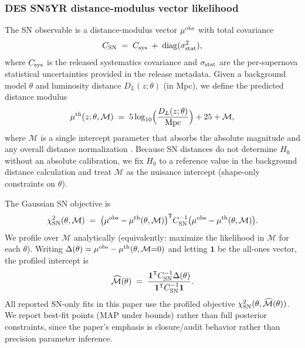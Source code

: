 \documentclass[11pt]{article}
\theoremstyle{definition}
\theoremstyle{plain}
\theoremstyle{remark}
\begin{document}
\subsubsection{DES SN5YR distance-modulus vector likelihood}\label{sec:methods:sn5yr_like}
The SN observable is a distance-modulus vector $\mu^{\rm obs}$ with total covariance
\begin{equation}
C_{\rm SN} \;=\; C_{\rm sys} \;+\; \mathrm{diag}(\sigma_{\rm stat}^2),
\label{eq:sn_cov_total}
\end{equation}
where $C_{\rm sys}$ is the released systematics covariance and $\sigma_{\rm stat}$ are the per-supernova statistical uncertainties provided in the release metadata.
Given a background model $\theta$ and luminosity distance $D_L(z;\theta)$ (in Mpc), we define the predicted distance modulus
\begin{equation}
\mu^{\rm th}(z;\theta,\mathcal{M}) \;=\; 5\log_{10}\!\Big(\frac{D_L(z;\theta)}{\mathrm{Mpc}}\Big) + 25 + \mathcal{M},
\label{eq:mu_th_def}
\end{equation}
where $\mathcal{M}$ is a single intercept parameter that absorbs the absolute magnitude and any overall distance normalization \cite{Hogg1999Distance}.
Because SN distances do not determine $H_0$ without an absolute calibration, we fix $H_0$ to a reference value in the background distance calculation and treat $\mathcal{M}$ as the nuisance intercept (shape-only constraints on $\theta$).

The Gaussian SN objective is
\begin{equation}
\chi^2_{\rm SN}(\theta,\mathcal{M}) \;=\;
\big(\mu^{\rm obs} - \mu^{\rm th}(\theta,\mathcal{M})\big)^{\mathsf T}
C_{\rm SN}^{-1}
\big(\mu^{\rm obs} - \mu^{\rm th}(\theta,\mathcal{M})\big).
\label{eq:sn_chi2}
\end{equation}
We profile over $\mathcal{M}$ analytically (equivalently: maximize the likelihood in $\mathcal{M}$ for each $\theta$).
Writing $\Delta(\theta)=\mu^{\rm obs}-\mu^{\rm th}(\theta,\mathcal{M}{=}0)$ and letting $\mathbf{1}$ be the all-ones vector, the profiled intercept is
\begin{equation}
\widehat{\mathcal{M}}(\theta) \;=\;
\frac{\mathbf{1}^{\mathsf T}C_{\rm SN}^{-1}\Delta(\theta)}{\mathbf{1}^{\mathsf T}C_{\rm SN}^{-1}\mathbf{1}}.
\label{eq:sn_Mhat}
\end{equation}
All reported SN-only fits in this paper use the profiled objective $\chi^2_{\rm SN}(\theta,\widehat{\mathcal{M}}(\theta))$.
We report best-fit points (MAP under bounds) rather than full posterior constraints, since the paper’s emphasis is closure/audit behavior rather than precision parameter inference.
\end{document}
